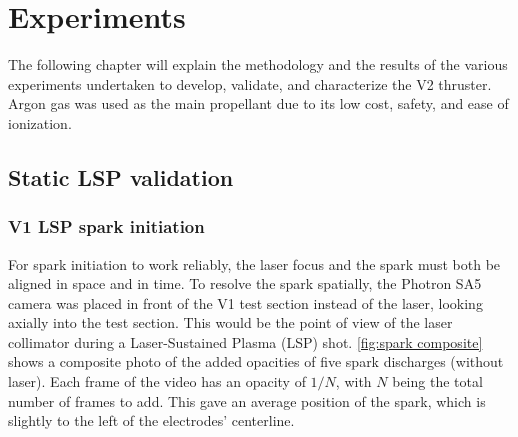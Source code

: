 \chapter{Experiments}

    The following chapter will explain the methodology and the results of the various experiments undertaken to develop, validate, and characterize the V2 thruster. Argon gas was used as the main propellant due to its low cost, safety, and ease of ionization.

    \section{Static LSP validation}

        \subsection{V1 LSP spark initiation}

            For spark initiation to work reliably, the laser focus and the spark must both be aligned in space and in time. To resolve the spark spatially, the Photron SA5 camera was placed in front of the V1 test section instead of the laser, looking axially into the test section. This would be the point of view of the laser collimator during a Laser-Sustained Plasma (LSP) shot. \autoref{fig:spark composite} shows a composite photo of the added opacities of five spark discharges (without laser). Each frame of the video has an opacity of $1/N$, with $N$ being the total number of frames to add. This gave an average position of the spark, which is slightly to the left of the electrodes' centerline.


